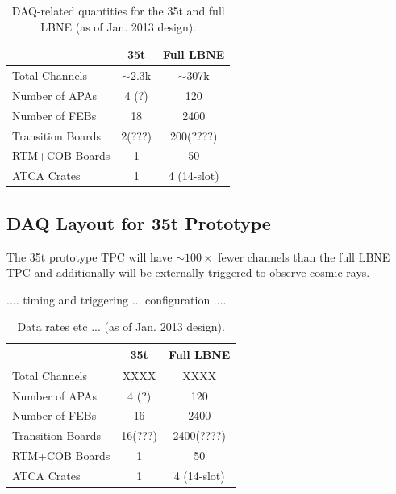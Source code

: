 \begin{table}[tbh]
\begin{center}
\begin{tabular}{|l|c|c|}   
\hline \hline 
    & 35t  & Full LBNE \\      
\hline
   Total Channels        & $\sim$2.3k &$\sim$307k \\ 
	Number of APAs     &  4 (?)     &    120        \\ 
   Number of FEBs       & 18 & 2400 \\ 
   Transition Boards    & 2(???) & 200(????) \\ 
   RTM+COB Boards    & 1   &  50 \\
   ATCA Crates            & 1   &  4 (14-slot)   \\ 
\hline \hline
\end{tabular}
\caption[]{DAQ-related quantities for the 35t and full LBNE (as of Jan. 2013 design).}
\label{tab:daqsumm} 
\end{center}
\end{table}

\subsection{DAQ Layout for 35t Prototype}

The 35t prototype TPC will have $\sim 100\times$ fewer channels than the full LBNE TPC and additionally will be externally triggered to observe cosmic rays.  



....  timing and triggering ...
configuration ....  




\begin{table}[tbh]
\begin{center}
\begin{tabular}{|l|c|c|}   
\hline \hline 
    & 35t  & Full LBNE \\      
\hline
   Total Channels        & XXXX&XXXX \\ 
	Number of APAs     &  4 (?)     &    120        \\ 
   Number of FEBs       & 16 & 2400 \\ 
   Transition Boards    & 16(???) & 2400(????) \\ 
   RTM+COB Boards    & 1   &  50 \\
   ATCA Crates            & 1   &  4 (14-slot)   \\ 
\hline \hline
\end{tabular}
\caption[]{Data rates etc ...   (as of Jan. 2013 design).}
\label{tab:datarates} 
\end{center}
\end{table}

